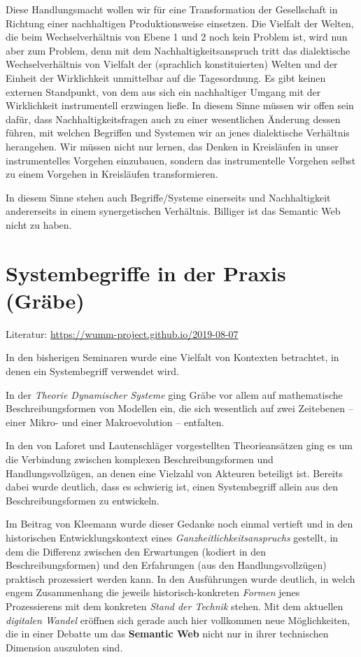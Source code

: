 \documentclass[11pt,a4paper]{article}
\begin{document}
Diese Handlungsmacht wollen wir für eine Transformation der Gesellschaft in
Richtung einer nachhaltigen Produktionsweise einsetzen. Die Vielfalt der
Welten, die beim Wechselverhältnis von Ebene 1 und 2 noch kein Problem ist,
wird nun aber zum Problem, denn mit dem Nachhaltigkeitsanspruch tritt das
dialektische Wechselverhältnis von Vielfalt der (sprachlich konstituierten)
Welten und der Einheit der Wirklichkeit unmittelbar auf die Tagesordnung. Es
gibt keinen externen Standpunkt, von dem aus sich ein nachhaltiger Umgang mit
der Wirklichkeit instrumentell erzwingen ließe. In diesem Sinne müssen wir
offen sein dafür, dass Nachhaltigkeitsfragen auch zu einer wesentlichen
Änderung dessen führen, mit welchen Begriffen und Systemen wir an jenes
dialektische Verhältnis herangehen. Wir müssen nicht nur lernen, das Denken in
Kreisläufen in unser instrumentelles Vorgehen einzubauen, sondern das
instrumentelle Vorgehen selbst zu einem Vorgehen in Kreisläufen
transformieren.

In diesem Sinne stehen auch Begriffe/Systeme einerseits und Nachhaltigkeit
andererseits in einem synergetischen Verhältnis. Billiger ist das Semantic Web
nicht zu haben.

\section{Systembegriffe in der Praxis (Gräbe)}

Literatur: \url{https://wumm-project.github.io/2019-08-07}

In den bisherigen Seminaren wurde eine Vielfalt von Kontexten betrachtet, in
denen ein Systembegriff verwendet wird.

In der \emph{Theorie Dynamischer Systeme} ging Gräbe vor allem auf
mathematische Beschreibungsformen von Modellen ein, die sich wesentlich auf
zwei Zeitebenen -- einer Mikro- und einer Makroevolution -- entfalten.

In den von Laforet und Lautenschläger vorgestellten Theorieansätzen ging es um
die Verbindung zwischen komplexen Beschreibungsformen und Handlungsvollzügen,
an denen eine Vielzahl von Akteuren beteiligt ist.  Bereits dabei wurde
deutlich, dass es schwierig ist, einen Systembegriff allein aus den
Beschreibungsformen zu entwickeln.

Im Beitrag von Kleemann wurde dieser Gedanke noch einmal vertieft und in den
historischen Entwicklungskontext eines \emph{Ganzheitlichkeitsanspruchs}
gestellt, in dem die Differenz zwischen den Erwartungen (kodiert in den
Beschreibungsformen) und den Erfahrungen (aus den Handlungsvollzügen)
praktisch prozessiert werden kann. In den Ausführungen wurde deutlich, in
welch engem Zusammenhang die jeweils historisch-konkreten \emph{Formen} jenes
Prozessierens mit dem konkreten \emph{Stand der Technik} stehen. Mit dem
aktuellen \emph{digitalen Wandel} eröffnen sich gerade auch hier vollkommen
neue Möglichkeiten, die in einer Debatte um das \textbf{Semantic Web} nicht
nur in ihrer technischen Dimension auszuloten sind.
\end{document}
